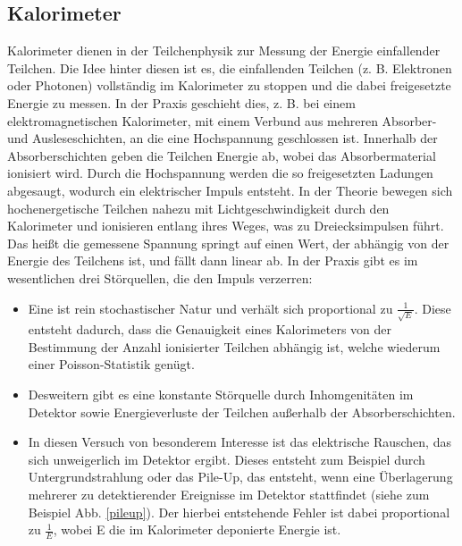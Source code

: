 \subsection{Kalorimeter}
Kalorimeter dienen in der Teilchenphysik zur Messung der Energie einfallender Teilchen.
Die Idee hinter diesen ist es, die einfallenden Teilchen (z. B. Elektronen oder Photonen) vollständig im Kalorimeter zu stoppen und die dabei freigesetzte Energie zu messen.
In der Praxis geschieht dies, z. B. bei einem elektromagnetischen Kalorimeter, mit einem Verbund aus mehreren Absorber- und Ausleseschichten, an die eine Hochspannung geschlossen ist.
Innerhalb der Absorberschichten geben die Teilchen Energie ab, wobei das Absorbermaterial ionisiert wird.
Durch die Hochspannung werden die so freigesetzten Ladungen abgesaugt, wodurch ein elektrischer Impuls entsteht.
In der Theorie bewegen sich hochenergetische Teilchen nahezu mit Lichtgeschwindigkeit durch den Kalorimeter und ionisieren entlang ihres Weges, was zu Dreiecksimpulsen führt.
Das heißt die gemessene Spannung springt auf einen Wert, der abhängig von der Energie des Teilchens ist, und fällt dann linear ab.
In der Praxis gibt es im wesentlichen drei Störquellen, die den Impuls verzerren:
\begin{itemize}
\item Eine ist rein stochastischer Natur und verhält sich proportional zu $\frac{1}{\sqrt{E}}$.
Diese entsteht dadurch, dass die Genauigkeit eines Kalorimeters von der Bestimmung der Anzahl ionisierter Teilchen abhängig ist, welche wiederum einer Poisson-Statistik genügt.

\item Desweitern gibt es eine konstante Störquelle durch Inhomgenitäten im Detektor sowie Energieverluste der Teilchen außerhalb der Absorberschichten.

\item In diesen Versuch von besonderem Interesse ist das elektrische Rauschen, das sich unweigerlich im Detektor ergibt.
Dieses entsteht zum Beispiel durch Untergrundstrahlung oder das Pile-Up, das entsteht, wenn eine Überlagerung mehrerer zu detektierender Ereignisse im Detektor stattfindet (siehe zum Beispiel Abb. \ref{pileup}).
Der hierbei entstehende Fehler ist dabei proportional zu $\frac{1}{E}$, wobei E die im Kalorimeter deponierte Energie ist.
\end{itemize}

